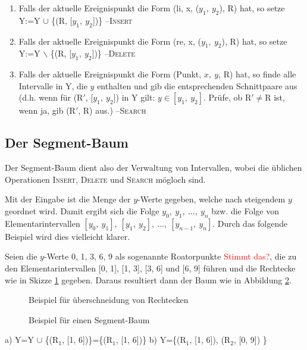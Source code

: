 \documentclass[ngerman,draft,parskip=half*,twoside]{scrreprt}
\theoremstyle{break}
\begin{document}
\begin{enumerate}
\item Falls der aktuelle Ereignispunkt die Form (li, x, ($y_1,\ y_2$), R) hat, so setze Y:=Y $\cup$ \{(R, [$y_1,\ y_2$])\} --\textsc{Insert}
\item Falls der aktuelle Ereignispunkt die Form (re, x, ($y_1,\ y_2$), R) hat, so setze Y:=Y $\backslash$ \{(R, [$y_1,\ y_2$])\}
--\textsc{Delete}
\item Falls der aktuelle Ereignispunkt die Form (Punkt, $x,\ y$, R) hat, so finde alle Intervalle in Y, die $y$  enthalten und gib die
entsprechenden Schnittpaare aus (d.h. wenn für (R$'$, [$y_1,\ y_2$]) in Y gilt: $y \in [y_1,\ y_2]$. Prüfe, ob R$' \not=$R ist, wenn
ja, gib (R$'$, R) aus.) --\textsc{Search}
\end{enumerate}
\subsection{Der Segment-Baum}
Der Segment-Baum dient also der Verwaltung von Intervallen, wobei die üblichen Operationen \textsc{Insert}, \textsc{Delete} und
\textsc{Search} mögloch sind.

Mit der Eingabe ist die Menge der $y$-Werte gegeben, welche nach steigendem $y$ geordnet wird. Damit ergibt sich die Folge $y_0,\ y_1,\
\ldots,\ y_n$ bzw. die Folge von Elementarintervallen $[y_0,\ y_1],\ [y_1,\ y_2],\ \ldots,\ [y_{n-1},\ y_n]$. Durch das folgende
Beispiel wird dies vielleicht klarer.

Seien die $y$-Werte 0, 1, 3, 6, 9 als sogenannte Roatorpunkte \textcolor{red}{Stimmt das?}, die zu den Elementarintervallen
[0, 1], [1, 3], [3, 6] und [6, 9] führen und die Rechtecke wie in Skizze \ref{031203f} gegeben. Daraus resultiert dann der Baum wie in
Abbildung \ref{031203g}.

\begin{figure}[H]
\centering

\caption{Beispiel für überschneidung von Rechtecken}
\label{031203f}

\end{figure}

\begin{figure}[H]
\centering
 
\caption{Beispiel für einen Segment-Baum}
\label{031203g}

\end{figure}

 a) Y=Y $\cup$ \{(R$_1$, [1, 6])\}=\{(R$_1$, [1, 6])\} \hspace{2em} b) Y=\{(R$_1$, [1, 6]), (R$_2$, [0, 9]) \}
\end{document}
